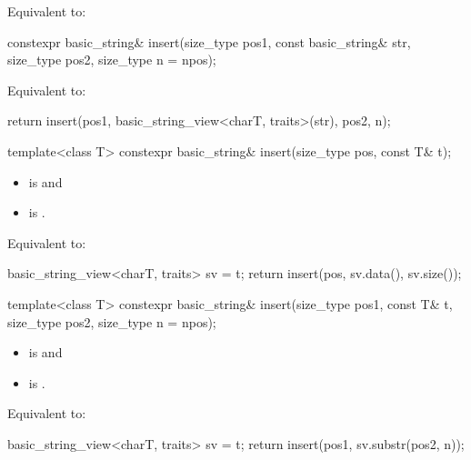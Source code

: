 \begin{itemdescr}
\pnum
\effects
Equivalent to: 
\end{itemdescr}

%
\begin{itemdecl}
constexpr basic_string& insert(size_type pos1, const basic_string& str,
                               size_type pos2, size_type n = npos);
\end{itemdecl}

\begin{itemdescr}
\pnum
\effects
Equivalent to:
\begin{codeblock}
return insert(pos1, basic_string_view<charT, traits>(str), pos2, n);
\end{codeblock}
\end{itemdescr}

%
\begin{itemdecl}
template<class T>
  constexpr basic_string& insert(size_type pos, const T& t);
\end{itemdecl}

\begin{itemdescr}
\pnum
\constraints
\begin{itemize}
\item
{} is
 and
\item
{} is
.
\end{itemize}

\pnum
\effects
Equivalent to:
\begin{codeblock}
basic_string_view<charT, traits> sv = t;
return insert(pos, sv.data(), sv.size());
\end{codeblock}
\end{itemdescr}

%
\begin{itemdecl}
template<class T>
  constexpr basic_string& insert(size_type pos1, const T& t,
                                 size_type pos2, size_type n = npos);
\end{itemdecl}

\begin{itemdescr}
\pnum
\constraints
\begin{itemize}
\item
{} is
 and
\item
{} is
.
\end{itemize}

\pnum
\effects
Equivalent to:
\begin{codeblock}
basic_string_view<charT, traits> sv = t;
return insert(pos1, sv.substr(pos2, n));
\end{codeblock}
\end{itemdescr}

